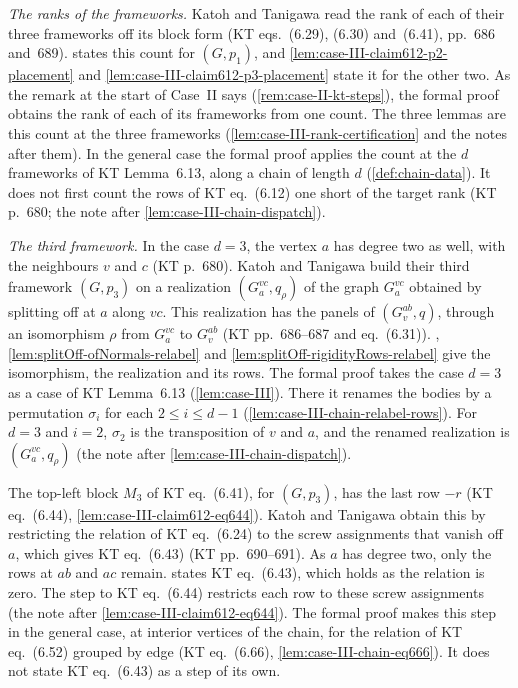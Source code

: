 \begin{remark}
  \emph{The ranks of the frameworks.} Katoh and Tanigawa read the rank
  of each of their three frameworks off its block form (KT
  eqs.~(6.29), (6.30) and~(6.41), pp.~686 and~689).
   states this count for $(G, p_1)$,
  and \cref{lem:case-III-claim612-p2-placement} and
  \cref{lem:case-III-claim612-p3-placement} state it for the other two.
  As the remark at the start of Case~II says
  (\cref{rem:case-II-kt-steps}), the formal proof obtains the rank of
  each of its frameworks from one count. The three lemmas are this count
  at the three frameworks (\cref{lem:case-III-rank-certification} and
  the notes after them). In the general case the formal proof applies
  the count at the $d$ frameworks of KT Lemma~6.13, along a chain of
  length $d$ (\cref{def:chain-data}). It does not first
  count the rows of KT eq.~(6.12) one short of the target rank (KT
  p.~680; the note after \cref{lem:case-III-chain-dispatch}).

  \emph{The third framework.} In the case $d = 3$, the vertex $a$ has
  degree two as well, with the neighbours $v$ and $c$ (KT p.~680).
  Katoh and Tanigawa build their third framework $(G, p_3)$ on a
  realization $(G_a^{vc}, q_\rho)$ of the graph $G_a^{vc}$ obtained by
  splitting off at $a$ along $vc$. This realization has the panels of
  $(G_v^{ab}, q)$, through an isomorphism $\rho$ from $G_a^{vc}$ to
  $G_v^{ab}$ (KT pp.~686--687 and eq.~(6.31)).
  ,
  \cref{lem:splitOff-ofNormals-relabel} and
  \cref{lem:splitOff-rigidityRows-relabel} give the isomorphism, the
  realization and its rows. The formal proof takes the case $d = 3$ as a
  case of KT Lemma~6.13 (\cref{lem:case-III}). There it renames the
  bodies by a permutation $\sigma_i$ for each $2 \le i \le d - 1$
  (\cref{lem:case-III-chain-relabel-rows}). For $d = 3$ and $i = 2$,
  $\sigma_2$ is the transposition of $v$ and $a$, and the renamed
  realization is $(G_a^{vc}, q_\rho)$ (the note after
  \cref{lem:case-III-chain-dispatch}).

  The top-left block $M_3$ of KT eq.~(6.41), for $(G, p_3)$, has the
  last row $-r$ (KT eq.~(6.44), \cref{lem:case-III-claim612-eq644}).
  Katoh and Tanigawa obtain this by restricting the relation of KT
  eq.~(6.24) to the screw assignments that vanish off $a$, which gives
  KT eq.~(6.43) (KT pp.~690--691). As $a$ has degree two, only the rows
  at $ab$ and $ac$ remain.  states KT
  eq.~(6.43), which holds as the relation is zero. The step to KT
  eq.~(6.44) restricts each row to these screw assignments (the note
  after \cref{lem:case-III-claim612-eq644}). The formal proof makes this
  step in the general case, at interior vertices of the chain, for the
  relation of KT eq.~(6.52) grouped by edge (KT eq.~(6.66),
  \cref{lem:case-III-chain-eq666}). It does not state KT eq.~(6.43) as a
  step of its own.


\end{remark}
